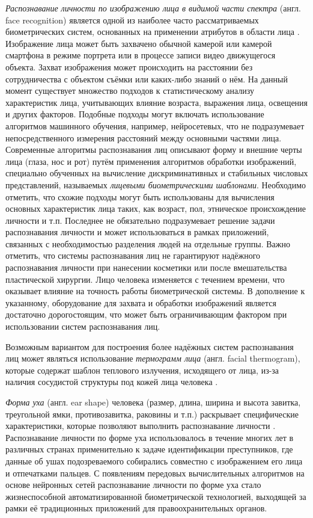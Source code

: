 \documentclass[12pt]{book}
\begin{document}
\large{\textit{Распознавание личности по изображению лица в видимой части спектра} (англ. face recognition) является одной из наиболее часто рассматриваемых биометрических систем, основанных на применении атрибутов в области лица \cite{unar_2014, minaee_2023, wang_2022}. Изображение лица может быть захвачено обычной камерой или камерой смартфона в режиме портрета или в процессе записи видео движущегося объекта. Захват изображения может происходить на расстоянии без сотрудничества с объектом съёмки или каких-либо знаний о нём. На данный момент существует множество подходов к статистическому анализу характеристик лица, учитывающих влияние возраста, выражения лица, освещения и других факторов. Подобные подходы могут включать использование алгоритмов машинного обучения, например, нейросетевых, что не подразумевает непосредственного измерения расстояний между основными частями лица. Современные алгоритмы распознавания лиц описывают форму и внешние черты лица (глаза, нос и рот) путём применения алгоритмов обработки изображений, специально обученных на вычисление дискриминативных и стабильных числовых представлений, называемых \textit{лицевыми биометрическими шаблонами}. Необходимо отметить, что схожие подходы могут быть использованы для вычисления основных характеристик лица таких, как возраст, пол, этническое происхождение личности и т.п. Последнее не обязательно подразумевает решение задачи распознавания личности и может использоваться в рамках приложений, связанных с необходимостью разделения людей на отдельные группы. Важно отметить, что системы распознавания лиц не гарантируют надёжного распознавания личности при нанесении косметики или после вмешательства пластической хирургии. Лицо человека изменяется с течением времени, что оказывает влияние на точность работы биометрической системы. В дополнение к указанному, оборудование для захвата и обработки изображений является достаточно дорогостоящим, что может быть ограничивающим фактором при использовании систем распознавания лиц.}

\large{Возможным вариантом для построения более надёжных систем распознавания лиц может являться использование \textit{термограмм лица} (англ. facial thermogram), которые содержат шаблон теплового излучения, исходящего от лица, из-за наличия сосудистой структуры под кожей лица человека \cite{unar_2014, lin_2021}.}

\large{\textit{Форма уха} (англ. ear shape) человека (размер, длина, ширина и высота завитка, треугольной ямки, противозавитка, раковины и т.п.) раскрывает специфические характеристики, которые позволяют выполнить распознавание личности \cite{unar_2014, minaee_2023}. Распознавание личности по форме уха использовалось в течение многих лет в различных странах применительно к задаче идентификации преступников, где данные об ушах подозреваемого собирались совместно с изображением его лица и отпечатками пальцев. С появлениям передовых вычислительных алгоритмов на основе нейронных сетей распознавание личности по форме уха стало жизнеспособной автоматизированной биометрической технологией, выходящей за рамки её традиционных приложений для правоохранительных органов.}
\end{document}
